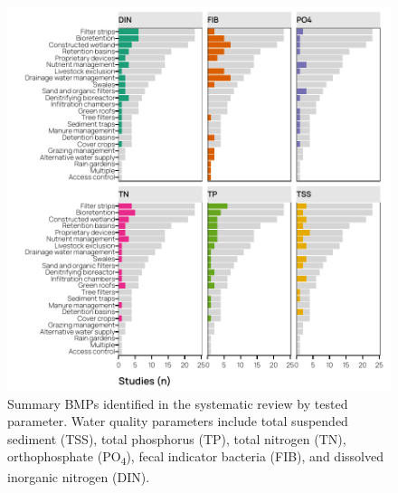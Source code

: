 \documentclass[utf8]{FrontiersinHarvard}
\begin{document}
\begin{figure}
\includegraphics[width=1\linewidth,]{../figures/bmp_summary_param} \caption{Summary BMPs identified in the systematic review by tested parameter. Water quality parameters include total suspended sediment (TSS), total phosphorus (TP), total nitrogen (TN), orthophosphate (PO\textsubscript{4}), fecal indicator bacteria (FIB), and dissolved inorganic nitrogen (DIN).}\label{fig:bmpsummaryparam}
\end{figure}
\end{document}
